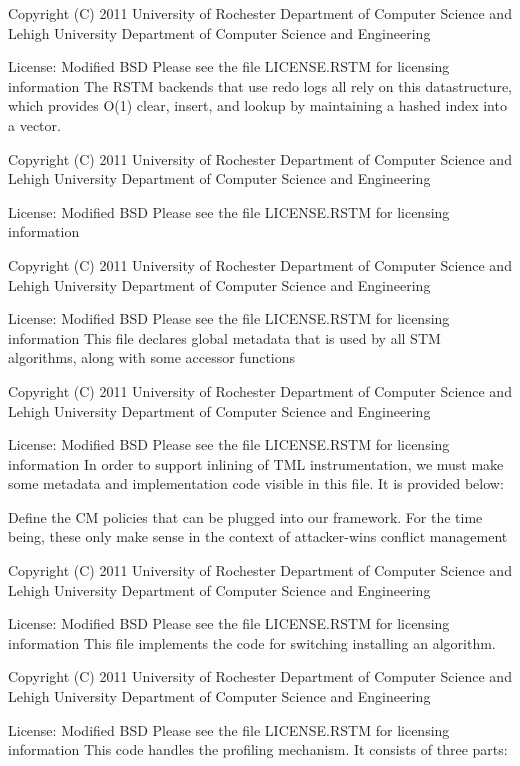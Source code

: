 Copyright (C) 2011 University of Rochester Department of Computer Science and Lehigh University Department of Computer Science and Engineering

License\-: Modified B\-S\-D Please see the file L\-I\-C\-E\-N\-S\-E.\-R\-S\-T\-M for licensing information The R\-S\-T\-M backends that use redo logs all rely on this datastructure, which provides O(1) clear, insert, and lookup by maintaining a hashed index into a vector.

Copyright (C) 2011 University of Rochester Department of Computer Science and Lehigh University Department of Computer Science and Engineering

License\-: Modified B\-S\-D Please see the file L\-I\-C\-E\-N\-S\-E.\-R\-S\-T\-M for licensing information

Copyright (C) 2011 University of Rochester Department of Computer Science and Lehigh University Department of Computer Science and Engineering

License\-: Modified B\-S\-D Please see the file L\-I\-C\-E\-N\-S\-E.\-R\-S\-T\-M for licensing information This file declares global metadata that is used by all S\-T\-M algorithms, along with some accessor functions

Copyright (C) 2011 University of Rochester Department of Computer Science and Lehigh University Department of Computer Science and Engineering

License\-: Modified B\-S\-D Please see the file L\-I\-C\-E\-N\-S\-E.\-R\-S\-T\-M for licensing information In order to support inlining of T\-M\-L instrumentation, we must make some metadata and implementation code visible in this file. It is provided below\-:

Define the C\-M policies that can be plugged into our framework. For the time being, these only make sense in the context of attacker-\/wins conflict management

Copyright (C) 2011 University of Rochester Department of Computer Science and Lehigh University Department of Computer Science and Engineering

License\-: Modified B\-S\-D Please see the file L\-I\-C\-E\-N\-S\-E.\-R\-S\-T\-M for licensing information This file implements the code for switching installing an algorithm.

Copyright (C) 2011 University of Rochester Department of Computer Science and Lehigh University Department of Computer Science and Engineering

License\-: Modified B\-S\-D Please see the file L\-I\-C\-E\-N\-S\-E.\-R\-S\-T\-M for licensing information This code handles the profiling mechanism. It consists of three parts\-:


